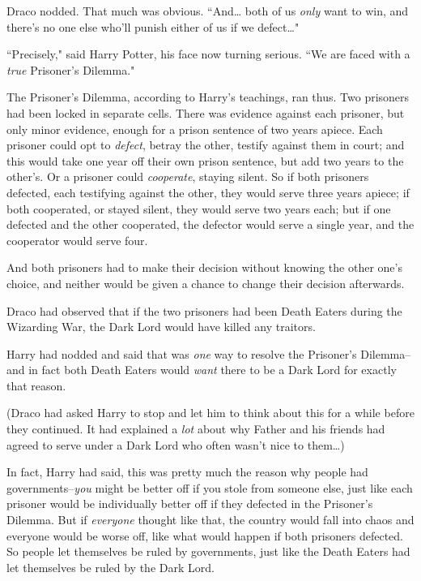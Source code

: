 Draco nodded. That much was obvious. ``And{\ldots} both of us \emph{only} want to win, and there's no one else who'll punish either of us if we defect{\ldots}"

``Precisely," said Harry Potter, his face now turning serious. ``We are faced with a \emph{true} Prisoner's Dilemma."

The Prisoner's Dilemma, according to Harry's teachings, ran thus. Two prisoners had been locked in separate cells. There was evidence against each prisoner, but only minor evidence, enough for a prison sentence of two years apiece. Each prisoner could opt to \emph{defect}, betray the other, testify against them in court; and this would take one year off their own prison sentence, but add two years to the other's. Or a prisoner could \emph{cooperate}, staying silent. So if both prisoners defected, each testifying against the other, they would serve three years apiece; if both cooperated, or stayed silent, they would serve two years each; but if one defected and the other cooperated, the defector would serve a single year, and the cooperator would serve four.

And both prisoners had to make their decision without knowing the other one's choice, and neither would be given a chance to change their decision afterwards.

Draco had observed that if the two prisoners had been Death Eaters during the Wizarding War, the Dark Lord would have killed any traitors.

Harry had nodded and said that was \emph{one} way to resolve the Prisoner's Dilemma\---and in fact both Death Eaters would \emph{want} there to be a Dark Lord for exactly that reason.

(Draco had asked Harry to stop and let him to think about this for a while before they continued. It had explained a \emph{lot} about why Father and his friends had agreed to serve under a Dark Lord who often wasn't nice to them{\ldots})

In fact, Harry had said, this was pretty much the reason why people had governments\---\emph{you} might be better off if you stole from someone else, just like each prisoner would be individually better off if they defected in the Prisoner's Dilemma. But if \emph{everyone} thought like that, the country would fall into chaos and everyone would be worse off, like what would happen if both prisoners defected. So people let themselves be ruled by governments, just like the Death Eaters had let themselves be ruled by the Dark Lord.

